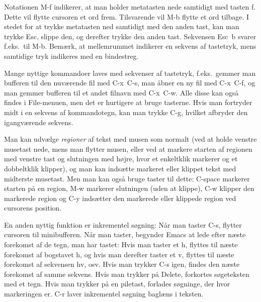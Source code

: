 \documentclass[a4paper]{article}
\begin{document}
Notationen \textsf{M-f} indikerer, at man holder metatasten nede
samtidigt med tasten \textsf{f}.  Dette vil flytte cursoren et ord
frem.  Tilsvarende vil \textsf{M-b} flytte et ord tilbage.  I stedet
for at trykke metatasten ned samtidigt med den anden tast, kan man
trykke \textsf{Esc}, slippe den, og derefter trykke den anden tast.
Sekvensen \textsf{Esc~b} svarer f.eks.\ til \textsf{M-b}.  Bemærk, at
mellemrummet indikerer en sekvens af tastetryk, mens samtidige tryk
indikeres med en bindestreg.

Mange nyttige kommandoer laves med sekvenser af tastetryk,
f.eks.\ gemmer man bufferen til den nuværende fil med
\textsf{C-x~C-s}, man åbner en ny fil med \textsf{C-x~C-f}, og man
gemmer bufferen til et andet filnavn med \textsf{C-x~C-w}.  Alle disse
kan også findes i \textsf{File}-menuen, men det er hurtigere at bruge
tasterne.  Hvis man fortryder midt i en sekvens af kommandotegn, kan
man trykke \textsf{C-g}, hvilket afbryder den igangværende sekvens.

Man kan udvælge \emph{regioner} af tekst med musen som normalt (ved at
holde venstre musetast nede, mens man flytter musen, eller ved at
markere starten af regionen med venstre tast og slutningen med højre,
hvor et enkeltklik markerer og et dobbeltklik klipper), og man kan
indsætte markeret eller klippet tekst med midterste musetast.  Men man
kan også bruge taster til dette: \textsf{C-space} markerer starten på
en region, \textsf{M-w} markerer slutningen (uden at klippe),
\textsf{C-w} klipper den markerede region og \textsf{C-y} indsætter
den markerede eller klippede region ved cursorens position.

En anden nyttig funktion er inkrementel søgning: Når man taster
\textsf{C-s}, flytter cursoren til minibufferen.  Når man taster,
begynder Emacs at lede efter næste forekomst af de tegn, man har
tastet: Hvis man taster et \textsf{h}, flyttes til næste forekomst af
bogstavet \textsf{h}, og hvis man derefter taster et \textsf{v},
flyttes til næste forekomst af sekvensen \textsf{hv}, osv. Hvis man
trykker \textsf{C-s} igen, findes den næste forekomst af samme
sekvens. Hvis man trykker på \textsf{Delete}, forkortes søgeteksten
med et tegn.  Hvis man trykker på en piletast, forlades søgninge, der
hvor markeringen er.  \textsf{C-r} laver inkrementel søgning baglæns i
teksten.
\end{document}
